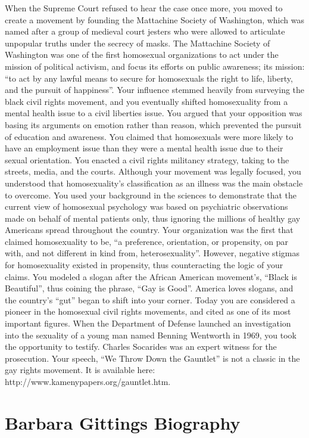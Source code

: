 When the Supreme Court refused to hear the case once more, you moved to create a movement by founding the Mattachine Society of Washington, which was named after a group of medieval court jesters who were allowed to articulate unpopular truths under the secrecy of masks. The Mattachine Society of Washington was one of the first homosexual organizations to act under the mission of political activism, and focus its efforts on public awareness; its mission: “to act by any lawful means to secure for homosexuals the right to life, liberty, and the pursuit of happiness”. Your influence stemmed heavily from surveying the black civil rights movement, and you eventually shifted homosexuality from a mental health issue to a civil liberties issue. You argued that your opposition was basing its arguments on emotion rather than reason, which prevented the pursuit of education and awareness. You claimed that homosexuals were more likely to have an employment issue than they were a mental health issue due to their sexual orientation.
You enacted a civil rights militancy strategy, taking to the streets, media, and the courts. Although your movement was legally focused, you understood that homosexuality’s classification as an illness was the main obstacle to overcome. You used your background in the sciences to demonstrate that the current view of homosexual psychology was based on psychiatric observations made on behalf of mental patients only, thus ignoring the millions of healthy gay Americans spread throughout the country. Your organization was the first that claimed homosexuality to be, “a preference, orientation, or propensity, on par with, and not different in kind from, heterosexuality”. However, negative stigmas for homosexuality existed in propensity, thus counteracting the logic of your claims. You modeled a slogan after the African American movement’s, “Black is Beautiful”, thus coining the phrase, “Gay is Good”. America loves slogans, and the country’s “gut” began to shift into your corner. Today you are considered a pioneer in the homosexual civil rights movements, and cited as one of its most important figures.
When the Department of Defense launched an investigation into the sexuality of a young man named Benning Wentworth in 1969, you took the opportunity to testify. Charles Socarides was an expert witness for the prosecution. Your speech, “We Throw Down the Gauntlet” is not a classic in the gay rights movement. It is available here: http:\slash \slash www.kamenypapers.org\slash gauntlet.htm.

\section{Barbara Gittings Biography}
\label{barbaragittingsbiography}

